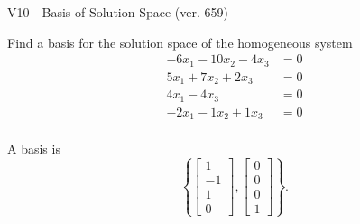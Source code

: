 \begin{exercise}
  \begin{exerciseTitle}V10 - Basis of Solution Space (ver. 659)\end{exerciseTitle}
  \begin{exerciseStatement}
    Find a basis for the solution space of the homogeneous system 
\begin{align*}
 -6 x_ 1 -10 x_ 2 -4 x_ 3 &= 0  \\ 
  5 x_ 1 + 7 x_ 2 + 2 x_ 3 &= 0  \\ 
  4 x_ 1 -4 x_ 3 &= 0  \\ 
  -2 x_ 1 -1 x_ 2 + 1 x_ 3 &= 0  \\ 
 \end{align*}


 
  \end{exerciseStatement}

  \begin{exerciseAnswer}
   A basis is   
\[\left\{\left[\begin{array}{c}
1 \\
-1 \\
1 \\
0
\end{array}\right] , \left[\begin{array}{c}
0 \\
0 \\
0 \\
1
\end{array}\right]\right\}.\]

  


  \end{exerciseAnswer}
\end{exercise}